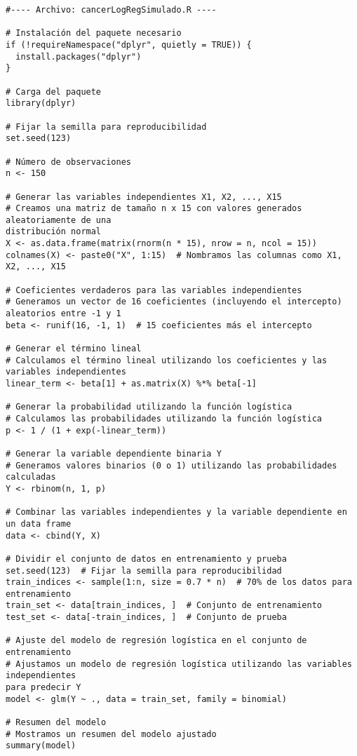 \begin{verbatim}
#---- Archivo: cancerLogRegSimulado.R ----

# Instalación del paquete necesario
if (!requireNamespace("dplyr", quietly = TRUE)) {
  install.packages("dplyr")
}

# Carga del paquete
library(dplyr)

# Fijar la semilla para reproducibilidad
set.seed(123)

# Número de observaciones
n <- 150

# Generar las variables independientes X1, X2, ..., X15
# Creamos una matriz de tamaño n x 15 con valores generados aleatoriamente de una 
distribución normal
X <- as.data.frame(matrix(rnorm(n * 15), nrow = n, ncol = 15))
colnames(X) <- paste0("X", 1:15)  # Nombramos las columnas como X1, X2, ..., X15

# Coeficientes verdaderos para las variables independientes
# Generamos un vector de 16 coeficientes (incluyendo el intercepto) aleatorios entre -1 y 1
beta <- runif(16, -1, 1)  # 15 coeficientes más el intercepto

# Generar el término lineal
# Calculamos el término lineal utilizando los coeficientes y las variables independientes
linear_term <- beta[1] + as.matrix(X) %*% beta[-1]

# Generar la probabilidad utilizando la función logística
# Calculamos las probabilidades utilizando la función logística
p <- 1 / (1 + exp(-linear_term))

# Generar la variable dependiente binaria Y
# Generamos valores binarios (0 o 1) utilizando las probabilidades calculadas
Y <- rbinom(n, 1, p)

# Combinar las variables independientes y la variable dependiente en un data frame
data <- cbind(Y, X)

# Dividir el conjunto de datos en entrenamiento y prueba
set.seed(123)  # Fijar la semilla para reproducibilidad
train_indices <- sample(1:n, size = 0.7 * n)  # 70% de los datos para entrenamiento
train_set <- data[train_indices, ]  # Conjunto de entrenamiento
test_set <- data[-train_indices, ]  # Conjunto de prueba

# Ajuste del modelo de regresión logística en el conjunto de entrenamiento
# Ajustamos un modelo de regresión logística utilizando las variables independientes 
para predecir Y
model <- glm(Y ~ ., data = train_set, family = binomial)

# Resumen del modelo
# Mostramos un resumen del modelo ajustado
summary(model)


\end{verbatim}
